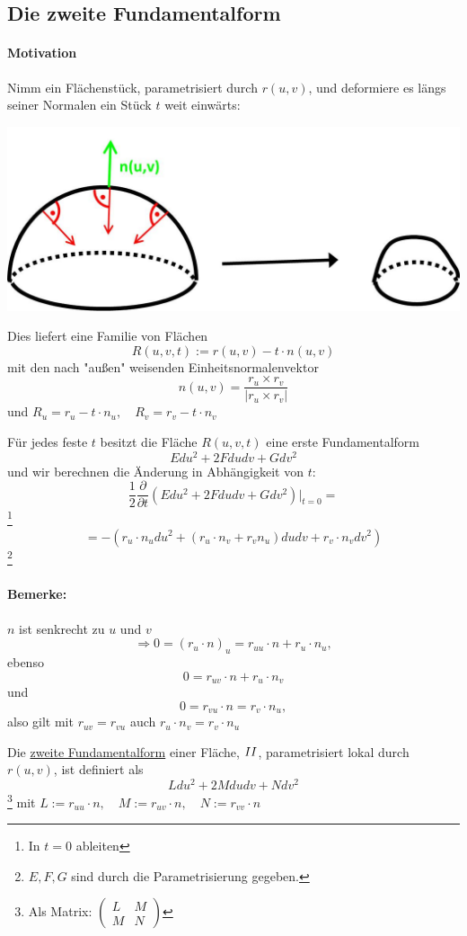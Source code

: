 \documentclass[a4paper,11pt,notitlepage]{report}
\theoremstyle{definition}
\newcommand{\RM}[1]{\MakeUppercase{\romannumeral #1{}}}
\newenvironment{definition}[1]{
	\begin{definitions}
	\marginnote{\emph{#1}}
}{\end{definitions}}
\begin{document}
\subsection{Die zweite Fundamentalform}
\paragraph{Motivation}
Nimm ein Flächenstück, parametrisiert durch $r(u,v)$, und deformiere es längs seiner Normalen ein Stück $t$ weit einwärts:  
	\begin{center}
		\includegraphics[scale=0.4]{images/2012_01_26_Bild2.jpg}
	\end{center}
Dies liefert eine Familie von Flächen
$$R(u,v,t) := r(u,v) - t \cdot n(u,v)$$
mit den nach "außen" weisenden Einheitsnormalenvektor
$$n(u,v) = \frac{r_u \times r_v}{|r_u \times r_v|}$$
und $R_u = r_u - t \cdot n_u, \quad R_v = r_v - t \cdot n_v$
\newline

Für jedes feste $t$ besitzt die Fläche $R(u,v,t)$ eine erste Fundamentalform
$$E du^2 + 2 F dudv + G dv^2$$
und wir berechnen die Änderung in Abhängigkeit von $t$: 
$$\frac{1}{2} \frac{\partial}{\partial t} (E du^2 + 2 F dudv + G dv^2) \big |_{t=0} = $$ \footnote{In $t=0$ ableiten}
$$= - (r_u \cdot n_u du^2 + (r_u \cdot n_v + r_v n_u) dudv + r_v \cdot n_v dv^2)$$
\footnote{$E, F, G$ sind durch die Parametrisierung gegeben.}

\paragraph{Bemerke:} $n$ ist senkrecht zu $u$ und $v$
$$\Rightarrow 0 = (r_u \cdot n)_u = r_{uu} \cdot n + r_u \cdot n_u,$$
ebenso
$$0 = r_{uv} \cdot n + r_u \cdot n_v$$ und
$$0 = r_{vu} \cdot n = r_v \cdot n_u,$$
also gilt mit $r_{uv} = r_{vu}$ auch $r_u \cdot n_v = r_v \cdot n_u$

\begin{definition}{zweite Fundamentalform}
	Die \underline{zweite Fundamentalform} einer Fläche, $\RM{2}$, parametrisiert lokal durch $r(u,v)$, ist definiert als
	$$\boxed{L du^2 + 2 M dudv + N dv^2}$$ \footnote{Als Matrix: $\begin{pmatrix}
	L & M \\ M & N
\end{pmatrix}$}
mit $L:= r_{uu} \cdot n, \quad M := r_{uv} \cdot n, \quad N:= r_{vv} \cdot n$
\end{definition}
\end{document}
